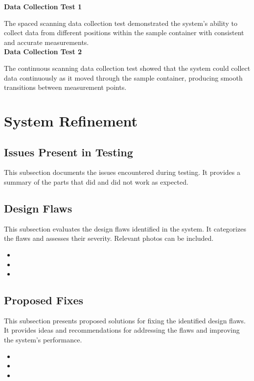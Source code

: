 \documentclass{UoNMCHA}
\numberwithin{equation}{section}
\begin{document}
\textbf{Data Collection Test 1}

The spaced scanning data collection test demonstrated the system's ability to collect data from different positions within the sample container with consistent and accurate measurements.\\

\textbf{Data Collection Test 2}

The continuous scanning data collection test showed that the system could collect data continuously as it moved through the sample container, producing smooth transitions between measurement points.\\
\newpage
\section{System Refinement}\label{sec:System Refinement}
\subsection{Issues Present in Testing}\label{sub:Issues Present in Testing}
This subsection documents the issues encountered during testing. It provides a summary of the parts that did and did not work as expected.

\subsection{Design Flaws}\label{sub:Design Flaws}
This subsection evaluates the design flaws identified in the system. It categorizes the flaws and assesses their severity. Relevant photos can be included.

\begin{itemize}
	\item 
	\item 
	\item 
\end{itemize}
\subsection{Proposed Fixes}\label{sub:Proposed Fixes}
This subsection presents proposed solutions for fixing the identified design flaws. It provides ideas and recommendations for addressing the flaws and improving the system's performance.

\begin{itemize}
	\item 
	\item 
	\item 
\end{itemize}
\newpage
\end{document}
